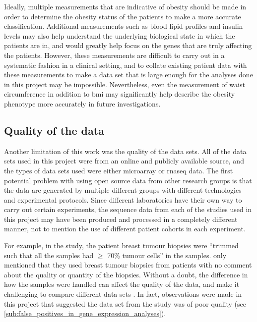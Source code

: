 Ideally, multiple measurements that are indicative of obesity should be made in order to determine the obesity status of the patients to make a more accurate classification.
Additional measurements such as blood lipid profiles and insulin levels may also help understand the underlying biological state in which the patients are in, and would greatly help focus on the genes that are truly affecting the patients.
However, these measurements are difficult to carry out in a systematic fashion in a clinical setting, and to collate existing patient data with these measurements to make a data set that is large enough for the analyses done in this project may be impossible.
Nevertheless, even the measurement of waist circumference in addition to \gls{bmi} may significantly help describe the obesity phenotype more accurately in future investigations.

\subsection{Quality of the data}
\label{sub:quality_of_the_data}

Another limitation of this work was the quality of the data sets.
All of the data sets used in this project were from an online and publicly available source, and the types of data sets used were either microarray or \gls{rnaseq} data.
The first potential problem with using open source data from other research groups is that the data are generated by multiple different groups with different technologies and experimental protocols.
Since different laboratories have their own way to carry out certain experiments, the sequence data from each of the studies used in this project may have been produced and processed in a completely different manner, not to mention the use of different patient cohorts in each experiment.

For example, in the \citet{Creighton2012} study, the patient breast tumour biopsies were ``trimmed such that all the samples had $\geq$ 70\% tumour cells'' in the samples.
\citet{Fuentes-Mattei2014} only mentioned that they used breast tumour biopsies from patients with no comment about the quality or quantity of the biopsies.
Without a doubt, the difference in how the samples were handled can affect the quality of the data, and make it challenging to compare different data sets \citep{Irizarry2005}.
In fact, observations were made in this project that suggested the data set from the \citet{Creighton2012} study was of poor quality (see \cref{sub:false_positives_in_gene_expression_analyses}).

